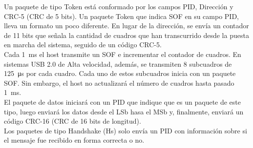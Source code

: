 	Un paquete de tipo Token está conformado por los campos PID, Dirección y CRC-5 (CRC de 5 bits). Un paquete Token que indica SOF en su campo PID, lleva un formato un poco diferente. En lugar de la dirección, se envía un contador de 11 bits que señala la cantidad de cuadros que han transcurrido desde la puesta en marcha del sistema, seguido de un código CRC-5.\\
		
	Cada \SI{1}{\milli\second} el host transmite un SOF e incrementar el contador de cuadros. En sistemas USB 2.0 de Alta velocidad, además, se transmiten 8 subcuadros de \SI{125}{\micro\second} por cada cuadro. Cada uno de estos subcuadros inicia con un paquete SOF. Sin embargo, el host no actualizará el número de cuadros hasta pasado \SI{1}{\milli\second}.\\
		
	El paquete de datos iniciará con un PID que indique que es un paquete de este tipo, luego enviará los datos desde el LSb hasa el MSb y, finalmente, enviará un código CRC-16 (CRC de 16 bits de longitud).\\
		
	Los paquetes de tipo Handshake (Hs) solo envía un PID con información sobre si el mensaje fue recibido en forma correcta o no.